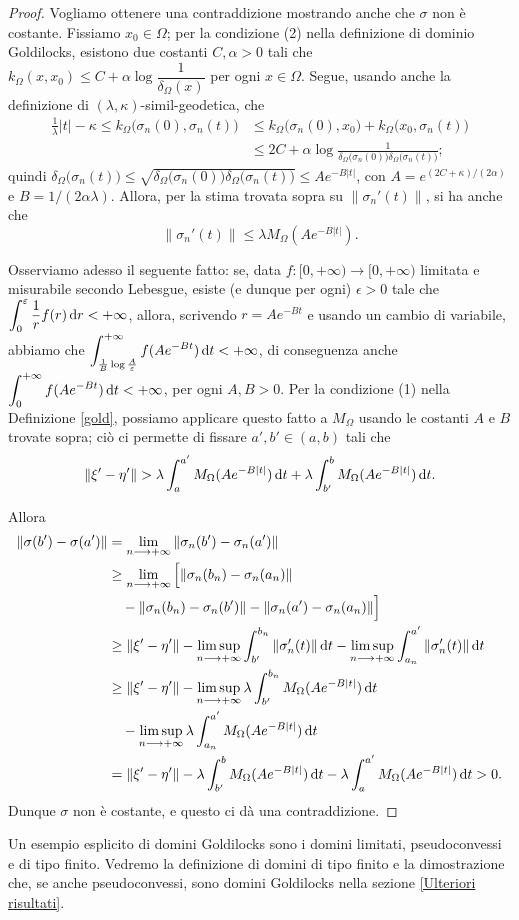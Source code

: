 \begin{proof}
    Vogliamo ottenere una contraddizione mostrando anche che $\sigma$ non è costante. Fissiamo $x_0\in\Omega$; per la condizione (2) nella definizione di dominio Goldilocks, esistono due costanti $C,\alpha>0$ tali che $k_\Omega(x,x_0) \le C+\alpha\log{\dfrac{1}{\delta_\Omega(x)}}$ per ogni $x\in\Omega$. Segue, usando anche la definizione di $(\lambda,\kappa)$-simil-geodetica, che
    \begin{align*}
        \frac{1}{\lambda}|t|-\kappa \le k_\Omega\big(\sigma_n(0),\sigma_n(t)\big) &\le k_\Omega\big(\sigma_n(0),x_0\big)+k_\Omega\big(x_0,\sigma_n(t)\big)\\
        &\le 2C+\alpha\log{\frac{1}{\delta_\Omega\big(\sigma_n(0)\big)\delta_\Omega\big(\sigma_n(t)\big)}};
    \end{align*}
    quindi $\delta_\Omega\big(\sigma_n(t)\big) \le \sqrt{\delta_\Omega\big(\sigma_n(0)\big)\delta_\Omega\big(\sigma_n(t)\big)} \le Ae^{-B|t|}$, con $A=e^{(2C+\kappa)/(2\alpha)}$ e $B=1/(2\alpha\lambda)$. Allora, per la stima trovata sopra su $\|\sigma_n'(t)\|$, si ha anche che
    $$\|\sigma_n'(t)\| \le \lambda M_\Omega(Ae^{-B|t|}).$$
    
    Osserviamo adesso il seguente fatto: se, data $f:[0,+\infty)\longrightarrow[0,+\infty)$ limitata e misurabile secondo Lebesgue, esiste (e dunque per ogni) $\epsilon>0$ tale che $\displaystyle \int_0^\varepsilon \frac{1}{r}f(r)\mathop{}\!\mathrm{d} r<+\infty$, allora, scrivendo $r=Ae^{-Bt}$ e usando un cambio di variabile, abbiamo che $\displaystyle\int_{\frac{1}{B}\log\frac{A}{\varepsilon}}^{+\infty} f(Ae^{-Bt})\mathop{}\!\mathrm{d} t<+\infty$, di conseguenza anche $\displaystyle\int_0^{+\infty} f(Ae^{-Bt})\mathop{}\!\mathrm{d} t<+\infty$, per ogni $A,B>0$. Per la condizione (1) nella Definizione \ref{gold}, possiamo applicare questo fatto a $M_\Omega$ usando le costanti $A$ e $B$ trovate sopra; ciò ci permette di fissare $a',b'\in(a,b)$ tali che
    $$\|\xi'-\eta'\|>\lambda\int_a^{a'} M_\Omega(Ae^{-B|t|})\diff t+\lambda\int_{b'}^b M_\Omega(Ae^{-B|t|})\diff t.$$

    Allora
    \begin{align*}
        \|\sigma(b')-\sigma(a')\|&=\lim_{n\longrightarrow+\infty}\|\sigma_n(b')-\sigma_n(a')\| \\
        & \ge \lim_{n\longrightarrow+\infty}\Big[\|\sigma_n(b_n)-\sigma_n(a_n)\|\\
        &\quad-\|\sigma_n(b_n)-\sigma_n(b')\|-\|\sigma_n(a')-\sigma_n(a_n)\|\Big] \\
        &\ge \|\xi'-\eta'\|-\limsup_{n\longrightarrow+\infty}\int_{b'}^{b_n}\|\sigma_n'(t)\|\mathop{}\!\mathrm{d} t-\limsup_{n\longrightarrow+\infty}\int_{a_n}^{a'}\|\sigma_n'(t)\|\mathop{}\!\mathrm{d} t\\
        &\ge \|\xi'-\eta'\|-\limsup_{n\longrightarrow+\infty}\lambda\int_{b'}^{b_n}M_\Omega(Ae^{-B|t|})\mathop{}\!\mathrm{d} t\\
        &\quad-\limsup_{n\longrightarrow+\infty}\lambda\int_{a_n}^{a'}M_\Omega(Ae^{-B|t|})\mathop{}\!\mathrm{d} t\\
        &=\|\xi'-\eta'\|-\lambda\int_{b'}^b M_\Omega(Ae^{-B|t|})\mathop{}\!\mathrm{d} t-\lambda\int_a^{a'}M_\Omega(Ae^{-B|t|})\mathop{}\!\mathrm{d} t>0.
    \end{align*}
    Dunque $\sigma$ non è costante, e questo ci dà una contraddizione.
\end{proof}

Un esempio esplicito di domini Goldilocks sono i domini limitati, pseudoconvessi e di tipo finito. Vedremo la definizione di domini di tipo finito e la dimostrazione che, se anche pseudoconvessi, sono domini Goldilocks nella sezione \ref{Ulteriori risultati}.